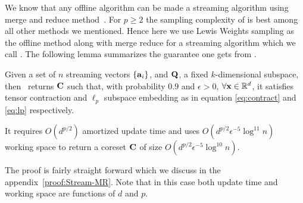 We know that any offline algorithm can be made a streaming algorithm using merge and reduce method~\cite{har2004coresets}. For $p \geq 2$ the sampling complexity of \cite{cohen2015p} is best among all other methods we mentioned. Hence here we use Lewis Weights sampling \cite{cohen2015p} as the offline method along with merge reduce for a streaming algorithm which we call \mrlw. The following lemma summarizes the guarantee one gets from \mrlw.
\begin{lemma}\label{lemma:Stream-MR}
 Given a set of $n$ streaming vectors $\{\mathbf{a}_{i}\}$, and $\mathbf{Q}$, a fixed $k$-dimensional subspace, then \mrlw~returns $\mathbf{C}$ such that, with probability
0.9 and $\epsilon > 0$, $\forall \mathbf{x}\in \mathbb{R}^{d}$, it satisfies tensor contraction and $\ell_{p}$ subspace embedding as in equation \eqref{eq:contract} and \eqref{eq:lp} respectively.

 It requires $O(d^{p/2})$ amortized update time and uses $O(d^{p/2}\epsilon^{-5}\log^{11} n)$ working space to return a coreset $\mathbf{C}$ of size $O(d^{p/2}\epsilon^{-5}\log^{10} n)$.
\end{lemma}
The proof is fairly straight forward which we discuss in the appendix~\ref{proof:Stream-MR}. Note that in this case both update time and working space are functions of $d$ and $p$. 

